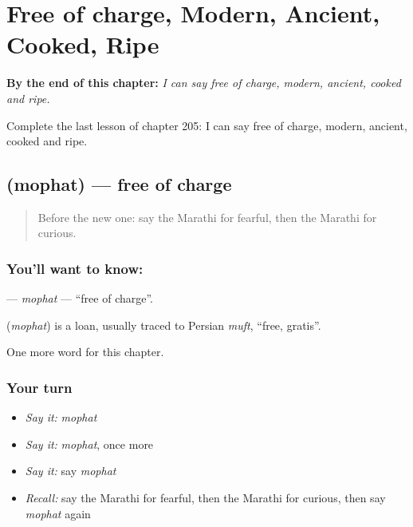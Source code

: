
\chapter{Free of charge, Modern, Ancient, Cooked, Ripe}
\label{ch:mr-free-of-charge-modern-ancient-cooked-ripe}

\begin{chapteropening}
\textbf{By the end of this chapter:} \emph{I can say free of charge, modern, ancient, cooked and ripe.}

Complete the last lesson of chapter 205: I can say free of charge, modern, ancient, cooked and ripe.
\end{chapteropening}

\section[\texorpdfstring{\mr{मोफत} (mophat)}{मोफत (mophat)}]{ (mophat) — free of charge}

\label{lesson:MR-C205-mophat}



\begin{quote}
Before the new one: say the Marathi for fearful, then the Marathi for curious.
\end{quote}

\subsection*{You'll want to know: }
\textbf{} — \emph{mophat} — \textquotedblleft{}free of charge\textquotedblright{}.

\begin{cousinweb}
\textbf{} (\emph{mophat}) is a loan, usually traced to Persian \emph{muft}, \textquotedblleft{}free, gratis\textquotedblright{}.
\end{cousinweb}

\begin{grammarlens}[title={What you've built}]
One more word for this chapter.
\end{grammarlens}

\subsection*{Your turn}
\begin{itemize}
\raggedright
  \item \emph{Say it:} \emph{mophat}
  \item \emph{Say it:} \emph{mophat}, once more
  \item \emph{Say it:} say \emph{mophat}
  \item \emph{Recall:} say the Marathi for fearful, then the Marathi for curious, then say \emph{mophat} again
\end{itemize}

